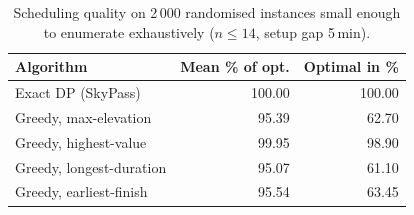 \begin{table}[t]
\caption{Scheduling quality on 2\,000 randomised instances small enough to enumerate exhaustively ($n \le 14$, setup gap 5\,min).}
\label{tab:scheduling}
\centering
\setlength{\tabcolsep}{4pt}
\begin{tabular}{lrr}
\toprule
Algorithm & Mean \% of opt. & Optimal in \% \\
\midrule
Exact DP (SkyPass) & 100.00 & 100.00 \\
\midrule
Greedy, max-elevation & 95.39 & 62.70 \\
Greedy, highest-value & 99.95 & 98.90 \\
Greedy, longest-duration & 95.07 & 61.10 \\
Greedy, earliest-finish & 95.54 & 63.45 \\
\bottomrule
\end{tabular}
\end{table}
